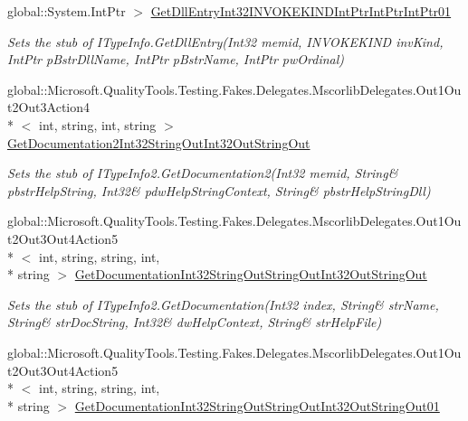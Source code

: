 \begin{DoxyCompactItemize}
global\-::\-System.\-Int\-Ptr $>$ \hyperlink{class_system_1_1_runtime_1_1_interop_services_1_1_com_types_1_1_fakes_1_1_stub_i_type_info2_a6188ec808457f57bda5911589894d99f}{Get\-Dll\-Entry\-Int32\-I\-N\-V\-O\-K\-E\-K\-I\-N\-D\-Int\-Ptr\-Int\-Ptr\-Int\-Ptr01}
\begin{DoxyCompactList}\small\item\em Sets the stub of I\-Type\-Info.\-Get\-Dll\-Entry(\-Int32 memid, I\-N\-V\-O\-K\-E\-K\-I\-N\-D inv\-Kind, Int\-Ptr p\-Bstr\-Dll\-Name, Int\-Ptr p\-Bstr\-Name, Int\-Ptr pw\-Ordinal)\end{DoxyCompactList}\item 
global\-::\-Microsoft.\-Quality\-Tools.\-Testing.\-Fakes.\-Delegates.\-Mscorlib\-Delegates.\-Out1\-Out2\-Out3\-Action4\\*
$<$ int, string, int, string $>$ \hyperlink{class_system_1_1_runtime_1_1_interop_services_1_1_com_types_1_1_fakes_1_1_stub_i_type_info2_a3de96481bb03ad8d7022f3f9a1a865ee}{Get\-Documentation2\-Int32\-String\-Out\-Int32\-Out\-String\-Out}
\begin{DoxyCompactList}\small\item\em Sets the stub of I\-Type\-Info2.\-Get\-Documentation2(Int32 memid, String\& pbstr\-Help\-String, Int32\& pdw\-Help\-String\-Context, String\& pbstr\-Help\-String\-Dll)\end{DoxyCompactList}\item 
global\-::\-Microsoft.\-Quality\-Tools.\-Testing.\-Fakes.\-Delegates.\-Mscorlib\-Delegates.\-Out1\-Out2\-Out3\-Out4\-Action5\\*
$<$ int, string, string, int, \\*
string $>$ \hyperlink{class_system_1_1_runtime_1_1_interop_services_1_1_com_types_1_1_fakes_1_1_stub_i_type_info2_a2f3edee5e669987d2e73bfa9d564870e}{Get\-Documentation\-Int32\-String\-Out\-String\-Out\-Int32\-Out\-String\-Out}
\begin{DoxyCompactList}\small\item\em Sets the stub of I\-Type\-Info2.\-Get\-Documentation(Int32 index, String\& str\-Name, String\& str\-Doc\-String, Int32\& dw\-Help\-Context, String\& str\-Help\-File)\end{DoxyCompactList}\item 
global\-::\-Microsoft.\-Quality\-Tools.\-Testing.\-Fakes.\-Delegates.\-Mscorlib\-Delegates.\-Out1\-Out2\-Out3\-Out4\-Action5\\*
$<$ int, string, string, int, \\*
string $>$ \hyperlink{class_system_1_1_runtime_1_1_interop_services_1_1_com_types_1_1_fakes_1_1_stub_i_type_info2_a6ad96434cf53a1d9349f3b77e3ff1c33}{Get\-Documentation\-Int32\-String\-Out\-String\-Out\-Int32\-Out\-String\-Out01}

\end{DoxyCompactItemize}
